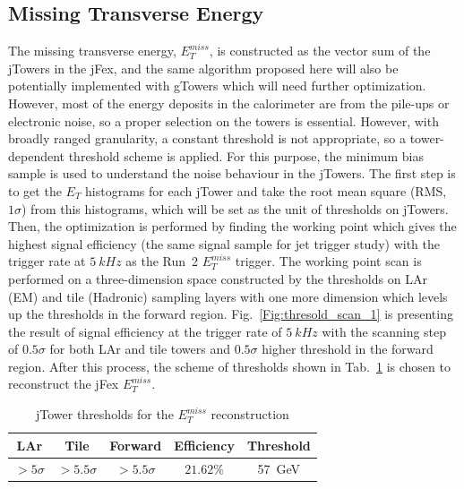 \subsection{Missing Transverse Energy}
The missing transverse energy, $E^{miss}_{T}$, is constructed as the vector sum of the jTowers in the jFex, and the same algorithm proposed here will also be potentially implemented with gTowers which will need further optimization. However, most of the energy deposits in the calorimeter are from the pile-ups or electronic noise, so a proper selection on the towers is essential. However, with broadly ranged granularity, a constant threshold is not appropriate, so a tower-dependent threshold scheme is applied. For this purpose, the minimum bias sample is used to understand the noise behaviour in the jTowers. The first step is to get the $E_{T}$ histograms for each jTower and take the root mean square (RMS, $1\sigma$) from this histograms, which will be set as the unit of thresholds on jTowers. Then, the optimization is performed by finding the working point which gives the highest signal efficiency (the same signal sample for jet trigger study) with the trigger rate at $5~kHz$ as the Run~2 $E^{miss}_{T}$ trigger. The working point scan is performed on a three-dimension space constructed by the thresholds on LAr (EM) and tile (Hadronic) sampling layers with one more dimension which levels up the thresholds in the forward region. Fig.~\ref{Fig:thresold_scan_1} is presenting the result of signal efficiency at the trigger rate of $5~kHz$ with the scanning step of $0.5\sigma$ for both LAr and tile towers and $0.5\sigma$ higher threshold in the forward region. After this process, the scheme of thresholds shown in Tab.~\ref{Tab:cuts_met} is chosen to reconstruct the jFex $E^{miss}_{T}$.
\begin{table}[h]
	\caption{jTower thresholds for the $E^{miss}_{T}$ reconstruction}
	\renewcommand{\arraystretch}{1.3}
	\centering
	\begin{tabular}{| c | c | c | c | c |  }
		\hline
		\hline
		LAr             &    Tile         &     Forward       & Efficiency & Threshold   \\
		\hline
		$>5\sigma$       &    $>5.5\sigma$  &     $>5.5\sigma$   &  $21.62\%$  &  57~GeV  \\
		\hline
	\end{tabular}
	\label{Tab:cuts_met}
\end{table}
